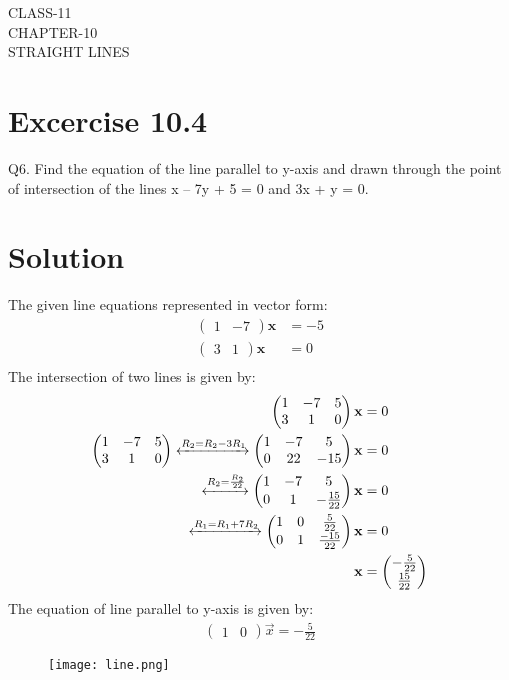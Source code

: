 \documentclass[12pt]{article}
\newcommand{\myvec}[1]{\ensuremath{\begin{pmatrix}#1\end{pmatrix}}}
\let\vec\mathbf
\begin{document}
\begin{center}
\textbf\large{CLASS-11 \\ CHAPTER-10 \\ STRAIGHT LINES}
\end{center}
\section*{Excercise 10.4}

Q6. Find the equation of the line parallel to y-axis and drawn through the point of
intersection of the lines x – 7y + 5 = 0 and 3x + y = 0.
\section*{Solution}
The given line equations represented in vector form:
\begin{align}
\myvec{1&-7}\vec{x}&=-5\\
\myvec{3&1}\vec{x}&=0\\
\end{align}
The intersection of two lines is given by:
\begin{align}
\myvec{
1&-7&5\\
3&1&0
} \vec{x}&=0\\
\myvec{
1&-7&5\\
3&1&0
}
\xleftrightarrow[]{R_2=R_2-3R_1}
\myvec{
1&-7&5\\
0&22&-15
}\vec{x}&=0\\\xleftrightarrow[]{R_2=\frac{R_2}{22}}
\myvec{
	1&-7&5\\[1pt]
0&1&-\frac{15}{22}
}\vec{x}&=0\\
\xleftrightarrow[]{R_1={R_1}+7{R_2}}
\myvec{
1&0&\frac{5}{22}\\[1pt]
0&1&\frac{-15}{22}
}\vec{x}&=0 \label{eq:7}\\
	\vec{x}&=\myvec{-\frac{5}{22}\\[1pt] \frac{15}{22}}\\
\end{align}
The equation of line parallel to y-axis is given by:
\begin{align}
    \myvec{1&0}\Vec{x}=-\frac{5}{22}
\end{align}
\begin{figure}[H]
	\begin{center} 
	    \texttt{[image: line.png]}
	\end{center}
\caption{}
\label{fig:Fig3}
\end{figure}
\end{document}
